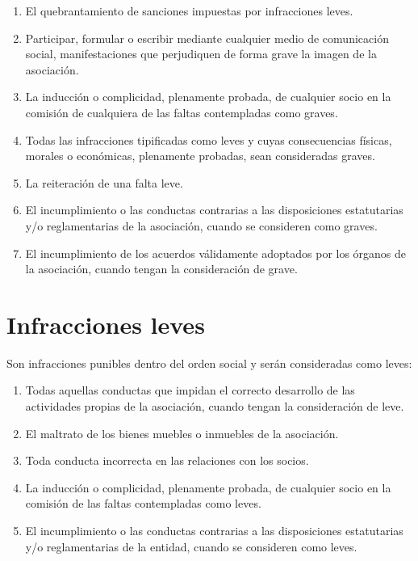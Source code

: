\documentclass[a4paper, 12pt, oneside]{book}
\begin{document}
\begin{enumerate}
    \item El quebrantamiento de sanciones impuestas por infracciones leves.  
    \item Participar, formular o escribir mediante cualquier medio de comunicación social, manifestaciones que perjudiquen de forma grave la imagen de la asociación.  
    \item La inducción o complicidad, plenamente probada, de cualquier socio en la comisión de cualquiera de las faltas contempladas como graves.  
    \item Todas las infracciones tipificadas como leves y cuyas consecuencias físicas, morales o económicas, plenamente probadas, sean consideradas graves.  
    \item La reiteración de una falta leve.  
    \item El incumplimiento o las conductas contrarias a las disposiciones estatutarias y/o reglamentarias de la asociación, cuando se consideren como graves.  
    \item El incumplimiento de los acuerdos válidamente adoptados por los órganos de la asociación, cuando tengan la consideración de grave.
\end{enumerate}

\section{Infracciones leves}

Son infracciones punibles dentro del orden social y serán consideradas como leves:

\begin{enumerate}
    \item Todas aquellas conductas que impidan el correcto desarrollo de las actividades propias de la asociación, cuando tengan la consideración de leve.  
    \item El maltrato de los bienes muebles o inmuebles de la asociación.  
    \item Toda conducta incorrecta en las relaciones con los socios.  
    \item La inducción o complicidad, plenamente probada, de cualquier socio en la comisión de las faltas contempladas como leves.  
    \item El incumplimiento o las conductas contrarias a las disposiciones estatutarias y/o reglamentarias de la entidad, cuando se consideren como leves.
\end{enumerate}
\end{document}
